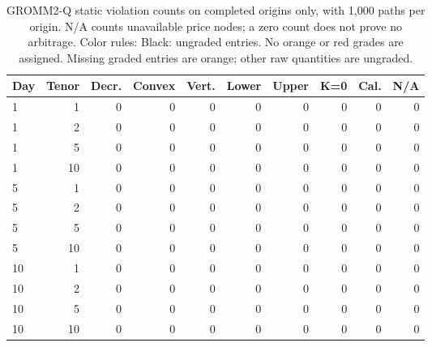 \documentclass[11pt]{article}
\begin{document}
\begin{table}[H]\centering\small\setlength{\tabcolsep}{4pt}
\caption{GROMM2-Q static violation counts on completed origins only, with 1,000 paths per origin. N/A counts unavailable price nodes; a zero count does not prove no arbitrage. Color rules: Black: ungraded entries. No orange or red grades are assigned. Missing graded entries are orange; other raw quantities are ungraded.}\label{tab:gromm2-q-static}
\begin{tabular}{@{}lrrrrrrrrr@{}}
\toprule
Day & Tenor & Decr. & Convex & Vert. & Lower & Upper & K=0 & Cal. & N/A \\
\midrule
1 & 1 & 0 & 0 & 0 & 0 & 0 & 0 & 0 & 0 \\
1 & 2 & 0 & 0 & 0 & 0 & 0 & 0 & 0 & 0 \\
1 & 5 & 0 & 0 & 0 & 0 & 0 & 0 & 0 & 0 \\
1 & 10 & 0 & 0 & 0 & 0 & 0 & 0 & 0 & 0 \\
5 & 1 & 0 & 0 & 0 & 0 & 0 & 0 & 0 & 0 \\
5 & 2 & 0 & 0 & 0 & 0 & 0 & 0 & 0 & 0 \\
5 & 5 & 0 & 0 & 0 & 0 & 0 & 0 & 0 & 0 \\
5 & 10 & 0 & 0 & 0 & 0 & 0 & 0 & 0 & 0 \\
10 & 1 & 0 & 0 & 0 & 0 & 0 & 0 & 0 & 0 \\
10 & 2 & 0 & 0 & 0 & 0 & 0 & 0 & 0 & 0 \\
10 & 5 & 0 & 0 & 0 & 0 & 0 & 0 & 0 & 0 \\
10 & 10 & 0 & 0 & 0 & 0 & 0 & 0 & 0 & 0 \\
\bottomrule\end{tabular}\end{table}
\end{document}

